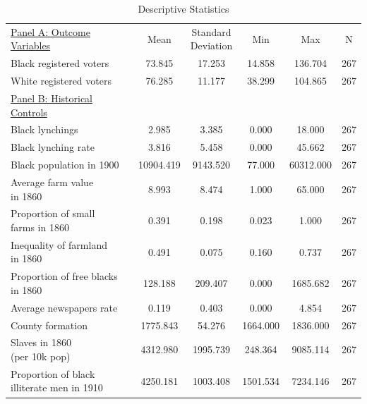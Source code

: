 \documentclass[AEJ, finalmode]{AEA}
\newcommand{\rowgroup}[1]{\hspace{-1em}#1}
\begin{document}
\begin{table}
\caption{Descriptive Statistics}
				\begin{tabular}{lccccc}
					\rowgroup{\underline{Panel A: Outcome Variables}} & Mean  & \makecell{Standard\\Deviation}   & Min   & Max  & N \\
					Black registered voters&      73.845&      17.253&      14.858&     136.704&         267\\
					White registered voters&      76.285&      11.177&      38.299&     104.865&         267\\
					\rowgroup{\underline{Panel B: Historical Controls}}    &   &    &    &   &  \\
					Black lynchings     &       2.985&       3.385&       0.000&      18.000&         267\\
					Black lynching rate &       3.816&       5.458&       0.000&      45.662&         267\\
					Black population in 1900&   10904.419&    9143.520&      77.000&   60312.000&         267\\
					\makecell[l]{Average farm value\\in 1860}&       8.993&       8.474&       1.000&      65.000&         267\\
					\makecell[l]{Proportion of small\\farms in 1860}&       0.391&       0.198&       0.023&       1.000&         267\\
					\makecell[l]{Inequality of farmland\\in 1860}&       0.491&       0.075&       0.160&       0.737&         267\\
					\makecell[l]{Proportion of free blacks\\in 1860}&     128.188&     209.407&       0.000&    1685.682&         267\\
					Average newspapers rate&       0.119&       0.403&       0.000&       4.854&         267\\
					County formation    &    1775.843&      54.276&    1664.000&    1836.000&         267\\
					\makecell[l]{Slaves in 1860\\(per 10k pop)}&    4312.980&    1995.739&     248.364&    9085.114&         267\\
					\makecell[l]{Proportion of black\\illiterate men in 1910}&    4250.181&    1003.408&    1501.534&    7234.146&         267\\

\end{tabular}
\end{table}
\end{document}
